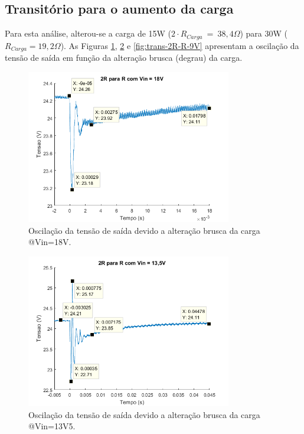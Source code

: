 \documentclass[a4paper]{article}
\begin{document}
{\subsection{Transitório para o aumento da carga}

Para esta análise, alterou-se a carga de 15W ($2 \cdot R_{Carga}~=~38,4\Omega$) para 30W ($R_{Carga} = 19,2\Omega$). As Figuras \ref{fig:trans-2R-R-18V}, \ref{fig:trans-2R-R-13V5} e \ref{fig:trans-2R-R-9V} apresentam a oscilação da tensão de saída em função da alteração brusca (degrau) da carga.

\begin{figure}[H]
	\centering
	\includegraphics[width=0.8\textwidth]{2R-para-R-18V.png}
	\caption{Oscilação da tensão de saída devido a alteração brusca da carga @Vin=18V.}
	\label{fig:trans-2R-R-18V}
\end{figure}

\begin{figure}[H]
	\centering
	\includegraphics[width=0.8\textwidth]{2R-para-R-13V5.png}
	\caption{Oscilação da tensão de saída devido a alteração brusca da carga @Vin=13V5.}
	\label{fig:trans-2R-R-13V5}
\end{figure}

}
\end{document}
